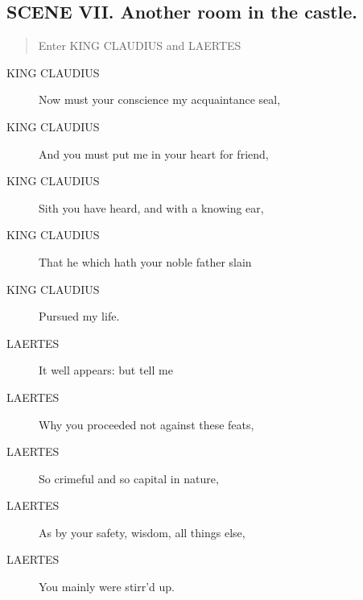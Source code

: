 \documentclass{article}
\begin{document}
\subsection{SCENE VII.  Another room in the castle.}
          
\begin{quote}
Enter KING CLAUDIUS and LAERTES
\end{quote}
          
\begin{description}
            
\item[KING CLAUDIUS] Now must your conscience my acquaintance seal,
\item[KING CLAUDIUS] And you must put me in your heart for friend,
\item[KING CLAUDIUS] Sith you have heard, and with a knowing ear,
\item[KING CLAUDIUS] That he which hath your noble father slain
\item[KING CLAUDIUS] Pursued my life.
\end{description}
          
\begin{description}
            
\item[LAERTES] It well appears: but tell me
\item[LAERTES] Why you proceeded not against these feats,
\item[LAERTES] So crimeful and so capital in nature,
\item[LAERTES] As by your safety, wisdom, all things else,
\item[LAERTES] You mainly were stirr'd up.
\end{description}
          
\end{document}
